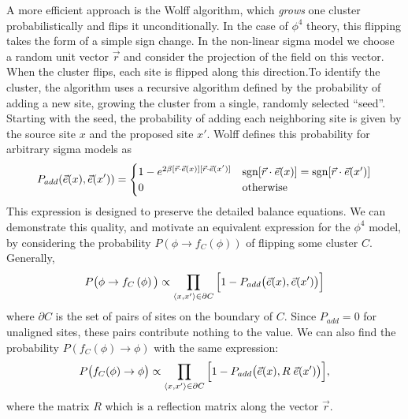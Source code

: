 A more efficient approach is the Wolff algorithm\cite{wolff1989}, which \textit{grows} one cluster probabilistically and flips it unconditionally. In the case of $\phi^4$ theory, this flipping takes the form of a simple sign change. In the non-linear sigma model we choose a random unit vector $\vec r$ and consider the projection of the field on this vector. When the cluster flips, each site is flipped along this direction.\citeneeded To identify the cluster, the algorithm uses a recursive algorithm defined by the probability of adding a new site, growing the cluster from a single, randomly selected ``seed''. Starting with the seed, the probability of adding each neighboring site is given by the source site $x$ and the proposed site $x'$. Wolff defines this probability for arbitrary sigma models as 
\begin{equation}
    \label{eq:phi4 wolff padd}
    P_{add}(\vec e(x),\vec e(x')) = \begin{cases} 
        1 - e^{2\beta [\vec{r} \cdot \vec e(x)][\vec{r} \cdot \vec e(x')]} & \mathrm{sgn}[\vec{r}\cdot\vec e(x)]=\mathrm{sgn}[\vec{r}\cdot\vec e(x')]\\
        0 & \mathrm{otherwise} \\
   \end{cases}
\end{equation}
This expression is designed to preserve the detailed balance equations. We can demonstrate this quality, and motivate an equivalent expression for the $\phi^4$ model, by considering the probability $P(\phi\rightarrow f_C(\phi))$ of flipping some cluster $C$. Generally,
\begin{equation}
    P\big(\phi \rightarrow f_C\left(\phi\right)\big) \propto \prod_{\langle x,x'\rangle \in \partial C}  \Big[1 - P_{add}\big(\vec e(x),\vec e(x')\big)\Big]
\end{equation}
where $\partial C$ is the set of pairs of sites on the boundary of $C$. Since $P_{add}=0$ for unaligned sites, these pairs contribute nothing to the value. We can also find the probability $P(f_C(\phi) \rightarrow \phi)$ with the same expression:
\begin{equation}
P\big(f_C(\phi)\rightarrow \phi \big) \propto \prod_{\langle x,x'\rangle \in \partial C}  \Big[1 - P_{add}\big(\vec e(x),R\;\vec e(x')\big)\Big],
\end{equation}
where the matrix $R$ which is a reflection matrix along the vector $\vec{r}$.

